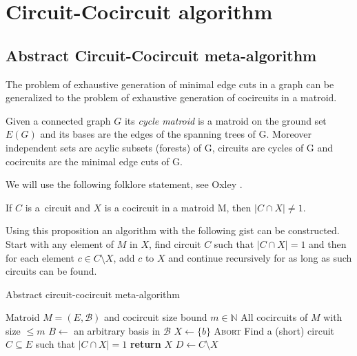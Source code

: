\chapter{Circuit-Cocircuit algorithm}
\label{ch:algorithm}

\section{Abstract Circuit-Cocircuit meta-algorithm}

The problem of exhaustive generation of minimal edge cuts in \linebreak a graph can be generalized to the problem of exhaustive generation of cocircuits in a matroid.

\begin{defn}
	\label{cycle_matroid}
	Given a connected graph $G$ its \textit{cycle matroid} is a matroid on the ground set $E(G)$ and its bases are the edges of the spanning trees of G. Moreover independent sets are acylic subsets (forests) of G, circuits are cycles of G and cocircuits are the minimal edge cuts of G.
\end{defn}

We will use the following folklore statement, see Oxley \cite{oxley2006matroid}.

\begin{prop}
	\label{prop_circuit-cocircuit}
	If $C$ is a~circuit and $X$ is a cocircuit in a matroid M, then $\lvert C \cap X \rvert \neq 1$.
\end{prop}

Using this proposition an algorithm with the following gist can be constructed. Start with any element of $M$ in $X$, find circuit $C$ such that $\lvert C \cap X \rvert = 1$ and then for each element $c \in C \setminus X$, add $c$ to $X$ and continue recursively for as long as such circuits can be found.

\clearpage

\begin{algorithm}
	\caption{Abstract circuit-cocircuit meta-algorithm}
	\label{meta-algorithm}
\begin{algorithmic}[1]
	\Require Matroid $M = (E, \mathcal{B})$ and cocircuit size bound $m \in \mathbb{N}$
	\Ensure All cocircuits of $M$ with size $\leq m$
	\State $B \leftarrow$ an arbitrary basis in $\mathcal{B}$
		\State $X \leftarrow \{b\}$
		\State {}
	\EndFor
		\State \textsc{Abort}
	\EndIf
	\State Find a (short) circuit $C \subseteq E$ such that $\lvert C \cap X \rvert = 1$
		\State \textbf{return} $X$ 
	\Else
		\State $D \leftarrow C \setminus X$
			\State {}
		\EndFor
	\EndIf

	\EndProcedure
\end{algorithmic}
\end{algorithm}

